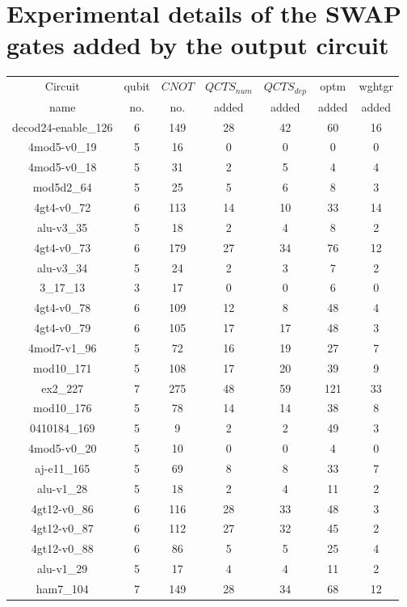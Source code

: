 \documentclass[runningheads]{llncs}
\begin{document}
\section{Experimental details of the SWAP gates added by the output circuit}
\begin{table}[H]
	\begin{center}  
	\begin{tabular}{|c|c|c|c|c|c|c|}
	\hline
	Circuit &  qubit  & $CNOT$ &$QCTS_{num}$& $QCTS_{dep}$  & optm 	 & wghtgr 	\\
	 name	&   no. 	&	no. & added&  added &  added 	&  added\\
	\hline
	decod24-enable\_126 & 6 & 149 & 28 & 42 & 60 & 16 \\ 
4mod5-v0\_19 & 5 & 16 & 0 & 0 & 0 & 0 \\ 
4mod5-v0\_18 & 5 & 31 & 2 & 5 & 4 & 4 \\ 
mod5d2\_64 & 5 & 25 & 5 & 6 & 8 & 3 \\ 
4gt4-v0\_72 & 6 & 113 & 14 & 10 & 33 & 14 \\ 
alu-v3\_35 & 5 & 18 & 2 & 4 & 8 & 2 \\ 
4gt4-v0\_73 & 6 & 179 & 27 & 34 & 76 & 12 \\ 
alu-v3\_34 & 5 & 24 & 2 & 3 & 7 & 2 \\ 
3\_17\_13 & 3 & 17 & 0 & 0 & 6 & 0 \\ 
4gt4-v0\_78 & 6 & 109 & 12 & 8 & 48 & 4 \\ 
4gt4-v0\_79 & 6 & 105 & 17 & 17 & 48 & 3 \\ 
4mod7-v1\_96 & 5 & 72 & 16 & 19 & 27 & 7 \\ 
mod10\_171 & 5 & 108 & 17 & 20 & 39 & 9 \\ 
ex2\_227 & 7 & 275 & 48 & 59 & 121 & 33 \\ 
mod10\_176 & 5 & 78 & 14 & 14 & 38 & 8 \\ 
0410184\_169 & 5 & 9 & 2 & 2 & 49 & 3 \\ 
4mod5-v0\_20 & 5 & 10 & 0 & 0 & 4 & 0 \\ 
aj-e11\_165 & 5 & 69 & 8 & 8 & 33 & 7 \\ 
alu-v1\_28 & 5 & 18 & 2 & 4 & 11 & 2 \\ 
4gt12-v0\_86 & 6 & 116 & 28 & 33 & 48 & 3 \\ 
4gt12-v0\_87 & 6 & 112 & 27 & 32 & 45 & 2 \\ 
4gt12-v0\_88 & 6 & 86 & 5 & 5 & 25 & 4 \\ 
alu-v1\_29 & 5 & 17 & 4 & 4 & 11 & 2 \\ 
ham7\_104 & 7 & 149 & 28 & 34 & 68 & 12 \\ 

\end{tabular}
\end{center}
\end{table}
\end{document}
